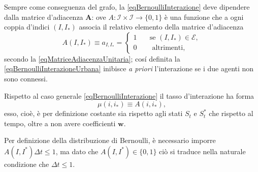         Sempre come conseguenza del grafo, la \ref{eqBernoulliInterazione} deve dipendere dalla matrice d'adiacenza \(\mathbf A\):
        ove \(A\colon\mathcal I\times\mathcal I\to\{0,1\}\) è una funzione che a ogni coppia d'indici \((I,I_*)\) associa il relativo elemento della matrice d'adiacenza
        \begin{equation*}
          \newcommand\hspz{\hspace{1em}}
          A(I,I_*)\equiv a_{I,I_*}=
          \left\{\begin{aligned}
            1&\hspz\text{se }(I,I_*)\in\mathcal E,\\
            0&\hspz\text{ altrimenti},%
          \end{aligned}\right.
        \end{equation*}
        secondo la \cref{eqMatriceAdiacenzaUnitaria}; cosí definita la \ref{eqBernoulliInterazioneUrbana} inibisce \textit{a priori} l'interazione se i due agenti non sono connessi.

        \begin{oss}
          \label{ossConfrontoBernoulliClassicoUrbano}
          Rispetto al caso generale \ref{eqBernoulliInterazione} il tasso d'interazione ha forma
          \begin{equation}
            \label{eqTassoInterazioneUrbano}
            \mu(i,i_*)\equiv A(i,i_*),
          \end{equation}
          esso, cioè, è per definizione costante sia rispetto agli stati \(S_t\) e \(S^*_t\) che rispetto al tempo, oltre a non avere coefficienti\footnotemark{} \(\mathbf w\).%
        \end{oss}

        \begin{oss}
          Per definizione della distribuzione di Bernoulli, è necessario imporre \(A(I,I^*)\Delta t\leq1\), ma dato che \(A(I,I^*)\in\{0,1\}\) ciò si traduce nella naturale condizione che \(\Delta t\leq1\).
        \end{oss}


